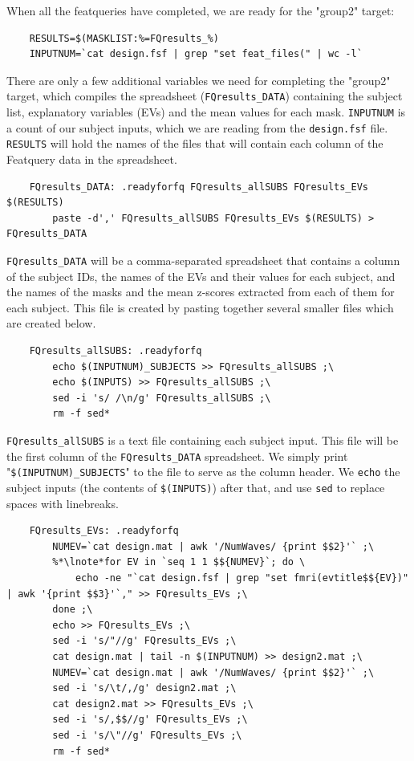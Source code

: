 When all the featqueries have completed, we are ready for the "group2" target:

\begin{lstlisting}
	RESULTS=$(MASKLIST:%=FQresults_%)
	INPUTNUM=`cat design.fsf | grep "set feat_files(" | wc -l`
\end{lstlisting}

There are only a few additional variables we need for completing the "group2" target, which compiles the spreadsheet (\texttt{FQresults_DATA}) containing the subject list, explanatory variables (EVs) and the mean values for each mask. \texttt{INPUTNUM} is a count of our subject inputs, which we are reading from the \texttt{design.fsf} file. \texttt{RESULTS} will hold the names of the files that will contain each column of the Featquery data in the spreadsheet.

\begin{lstlisting}	
	FQresults_DATA: .readyforfq FQresults_allSUBS FQresults_EVs $(RESULTS)
		paste -d',' FQresults_allSUBS FQresults_EVs $(RESULTS) > FQresults_DATA
\end{lstlisting}

\texttt{FQresults_DATA} will be a comma-separated spreadsheet that contains a column of the subject IDs, the names of the EVs and their values for each subject, and the names of the masks and the mean z-scores extracted from each of them for each subject. This file is created by pasting together several smaller files which are created below.

\begin{lstlisting}	
	FQresults_allSUBS: .readyforfq
		echo $(INPUTNUM)_SUBJECTS >> FQresults_allSUBS ;\
		echo $(INPUTS) >> FQresults_allSUBS ;\
		sed -i 's/ /\n/g' FQresults_allSUBS ;\
		rm -f sed*
\end{lstlisting}

\texttt{FQresults_allSUBS} is a text file containing each subject input. This file will be the first column of the \texttt{FQresults_DATA} spreadsheet. We simply print "\texttt{\$(INPUTNUM)_SUBJECTS}" to the file to serve as the column header. We \texttt{echo} the subject inputs (the contents of \texttt{\$(INPUTS)}) after that, and use \texttt{sed} to replace spaces with linebreaks. 

\begin{lstlisting}
	FQresults_EVs: .readyforfq
		NUMEV=`cat design.mat | awk '/NumWaves/ {print $$2}'` ;\
		%*\lnote*for EV in `seq 1 1 $${NUMEV}`; do \
			echo -ne "`cat design.fsf | grep "set fmri(evtitle$${EV})" | awk '{print $$3}'`," >> FQresults_EVs ;\
		done ;\
		echo >> FQresults_EVs ;\
		sed -i 's/"//g' FQresults_EVs ;\
		cat design.mat | tail -n $(INPUTNUM) >> design2.mat ;\
		NUMEV=`cat design.mat | awk '/NumWaves/ {print $$2}'` ;\
		sed -i 's/\t/,/g' design2.mat ;\
		cat design2.mat >> FQresults_EVs ;\
		sed -i 's/,$$//g' FQresults_EVs ;\
		sed -i 's/\"//g' FQresults_EVs ;\
		rm -f sed*
\end{lstlisting}

